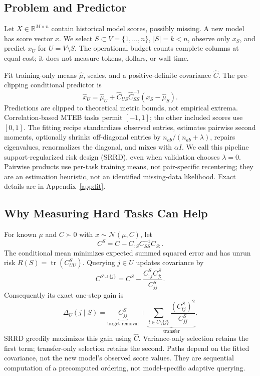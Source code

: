 \documentclass{article}
\newcommand{\R}{\mathbb{R}}
\newcommand{\tr}{\operatorname{tr}}
\begin{document}
\subsection{Problem and Predictor}
Let $X\in\R^{M\times n}$ contain historical model scores, possibly missing. A new model has score vector $x$. We select $S\subset V=\{1,\ldots,n\}$, $|S|=k<n$, observe only $x_S$, and predict $x_U$ for $U=V\setminus S$. The operational budget counts complete columns at equal cost; it does not measure tokens, dollars, or wall time.

Fit training-only means $\hat\mu$, scales, and a positive-definite covariance $\hat C$. The pre-clipping conditional predictor is
\begin{equation}
\hat x_U=\hat\mu_U+\hat C_{US}\hat C_{SS}^{-1}(x_S-\hat\mu_S).
\label{eq:predict}
\end{equation}
Predictions are clipped to theoretical metric bounds, not empirical extrema. Correlation-based MTEB tasks permit $[-1,1]$; the other included scores use $[0,1]$. The fitting recipe standardizes observed entries, estimates pairwise second moments, optionally shrinks off-diagonal entries by $n_{ab}/(n_{ab}+\lambda)$, repairs eigenvalues, renormalizes the diagonal, and mixes with $\alpha I$. We call this pipeline support-regularized risk design (SRRD), even when validation chooses $\lambda=0$. Pairwise products use per-task training means, not pair-specific recentering; they are an estimation heuristic, not an identified missing-data likelihood. Exact details are in Appendix~\ref{app:fit}.

\subsection{Why Measuring Hard Tasks Can Help}
For known $\mu$ and $C\succ0$ with $x\sim\mathcal N(\mu,C)$, let
\begin{equation}
C^S=C-C_{:S}C_{SS}^{-1}C_{S:}.
\label{eq:conditional}
\end{equation}
The conditional mean minimizes expected summed squared error and has unrun risk $R(S)=\tr(C^S_{UU})$. Querying $j\in U$ updates covariance by
\begin{equation}
C^{S\cup\{j\}}=C^S-\frac{C^S_{:j}C^S_{j:}}{C^S_{jj}}.
\label{eq:update}
\end{equation}
Consequently its exact one-step gain is
\begin{equation}
\Delta_U(j\mid S)=\underbrace{C^S_{jj}}_{\text{target removal}}+
\underbrace{\sum_{t\in U\setminus\{j\}}\frac{(C^S_{tj})^2}{C^S_{jj}}}_{\text{transfer}}.
\label{eq:gain}
\end{equation}
SRRD greedily maximizes this gain using $\hat C$. Variance-only selection retains the first term; transfer-only selection retains the second. Paths depend on the fitted covariance, not the new model's observed score values. They are sequential computation of a precomputed ordering, not model-specific adaptive querying.
\end{document}
